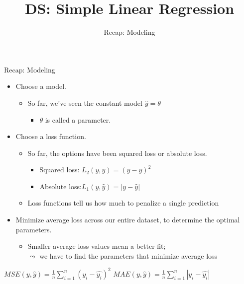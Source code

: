 \documentclass[aspectratio=169]{../latex_main/tntbeamer}  %
\title[Regression]{DS: Simple Linear Regression}
\subtitle{Recap: Modeling}
\begin{document}
	
	\maketitle
	\begin{frame}{Recap: Modeling}
	    \begin{itemize}
	        \item Choose a model.
	        \begin{itemize}
	            \item So far, we’ve seen the constant model $\hat{y} = \theta $
	            \begin{itemize}
	                \item $\theta$ is called a parameter.
	            \end{itemize}
	        \end{itemize}
	       \item Choose a loss function.
            \begin{itemize}
                \item So far, the options have been squared loss or absolute loss.
                \begin{itemize}
                    \item Squared loss: $L_2(y,\hat{y}) = (y-\hat{y})^2$
                    \item Absolute loss:$ L_1(y,\hat{y}) = |y-\hat{y}|$
                \end{itemize}
                \item Loss functions tell us how much to penalize a single prediction
            \end{itemize}
            \item Minimize average loss across our entire dataset, to determine the optimal parameters.
            \begin{itemize}
                \item Smaller average loss values mean a better fit;\\ $\leadsto$ we have to find the parameters that minimize average loss
            \end{itemize}
	    \end{itemize}
	    \centering
	    $MSE(y,\hat{y})= \frac{1}{n}\sum\limits_{i=1}^n(y_i-\hat{y_i})^2$
	    \hspace{3cm}
	    $MAE(y,\hat{y})= \frac{1}{n}\sum\limits_{i=1}^n|y_i-\hat{y_i}|$
	\end{frame}
\end{document}
